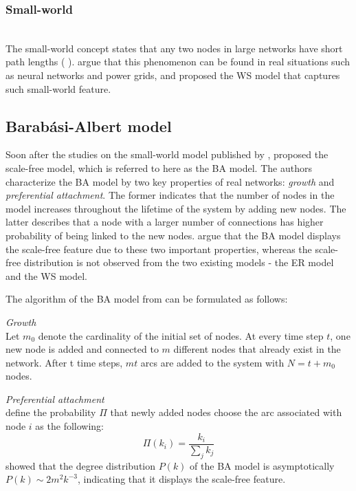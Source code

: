 \subsubsection{Small-world}\\
The small-world concept states that any two nodes in large networks have short path lengths (\citeauthor{watts1998} \cite{watts1998}). \citeauthor{watts1998} \cite{watts1998} argue that this phenomenon can be found in real situations such as neural networks and power grids, and proposed the WS model that captures such small-world feature.

\subsection{Barab\'asi-Albert model}
Soon after the studies on the small-world model published by \citeauthor{watts1998} \cite{watts1998}, \citeauthor{barabasi1999emergence} \cite{barabasi1999emergence} proposed the scale-free model, which is referred to here as the BA model. The authors characterize the BA model by two key properties of real networks: \textit{growth} and \textit{preferential attachment}. The former indicates that the number of nodes in the model increases throughout the lifetime of the system by adding new nodes. The latter describes that a node with a larger number of connections has higher probability of being linked to the new nodes. \citeauthor{barabasi1999emergence} \cite{barabasi1999emergence} argue that the BA model displays the scale-free feature due to these two important properties, whereas the scale-free distribution is not observed from the two existing models - the ER model and the WS model.

The algorithm of the BA model from \citeauthor{barabasi1999emergence} \cite{barabasi1999emergence} can be formulated as follows:

\textit{Growth}\\
Let $m_0$ denote the cardinality of the initial set of nodes. At every time step $t$, one new node is added and connected to $m$ different nodes that already exist in the network. After t time steps, $mt$ arcs are added to the system with $N = t + m_0$ nodes.

\textit{Preferential attachment}\\
\citeauthor{barabasi1999emergence} \cite{barabasi1999emergence} define the probability $\Pi$ that newly added nodes choose the arc associated with node $i$ as the following:
$$\Pi(k_i) = \frac{k_i}{\sum_{j}k_j}$$
\citeauthor{barabasi1999mean} \cite{barabasi1999mean} showed that the degree distribution $P(k)$ of the BA model is asymptotically $P(k) \sim 2m^2k^{-3}$, indicating that it displays the scale-free feature.

